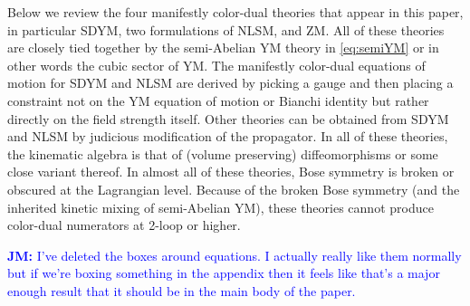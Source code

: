 \documentclass[11pt,letter]{article}
\newcommand{\jm}[1]{\textcolor{blue}{\textbf{JM: }{#1}}}
\begin{document}
Below we review the four manifestly color-dual theories that appear in this paper, in particular SDYM, two formulations of NLSM, and ZM.
All of these theories are closely tied together by the semi-Abelian YM theory in \cref{eq:semiYM} or in other words the cubic sector of YM.
The manifestly color-dual equations of motion for SDYM and NLSM are derived by picking a gauge and then placing a constraint not on the YM equation of motion or Bianchi identity but rather directly on the field strength itself.
Other theories can be obtained from SDYM and NLSM by judicious modification of the propagator.
In all of these theories, the kinematic algebra is that of (volume preserving) diffeomorphisms or some close variant thereof.
In almost all of these theories, Bose symmetry is broken or obscured at the Lagrangian level.
Because of the broken Bose symmetry (and the inherited kinetic mixing of semi-Abelian YM), these theories cannot produce color-dual numerators at 2-loop or higher.

\jm{I've deleted the boxes around equations.  I actually really like them normally but if we're boxing something in the appendix then it feels like that's a major enough result that it should be in the main body of the paper.}
\end{document}
